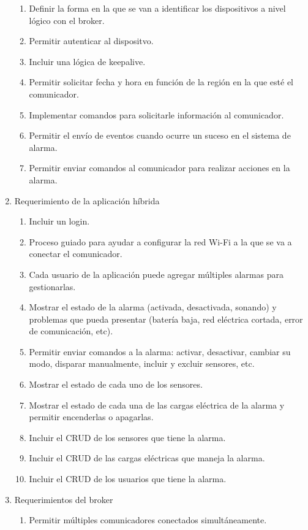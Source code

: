 \documentclass[
11pt, %
codirector, %
]{charter}
\begin{document}
\begin{enumerate}
		\begin{enumerate}
			\item Definir la forma en la que se van a identificar los dispositivos a nivel lógico con el broker.
			\item Permitir autenticar al dispositvo.
			\item Incluir una lógica de keepalive.
			\item Permitir solicitar fecha y hora en función de la región en la que esté el comunicador.
			\item Implementar comandos para solicitarle información al comunicador.
			\item Permitir el envío de eventos cuando ocurre un suceso en el sistema de alarma.
			\item Permitir enviar comandos al comunicador para realizar acciones en la alarma.
		\end{enumerate}
	\item Requerimiento de la aplicación híbrida
		\begin{enumerate}
			\item Incluir un login.
			\item Proceso guiado para ayudar a configurar la red Wi-Fi a la que se va a conectar el comunicador.
			\item Cada usuario de la aplicación puede agregar múltiples alarmas para gestionarlas.
			\item Mostrar el estado de la alarma (activada, desactivada, sonando) y problemas que pueda presentar (batería baja, red eléctrica cortada, error de comunicación, etc).
			\item Permitir enviar comandos a la alarma: activar, desactivar, cambiar su modo, disparar manualmente, incluir y excluir sensores, etc.
			\item Mostrar el estado de cada uno de los sensores.
			\item Mostrar el estado de cada una de las cargas eléctrica de la alarma y permitir encenderlas o apagarlas.
			\item Incluir el CRUD de los sensores que tiene la alarma.
			\item Incluir el CRUD de las cargas eléctricas que maneja la alarma.
			\item Incluir el CRUD de los usuarios que tiene la alarma.
		\end{enumerate}
	\item Requerimientos del broker
		\begin{enumerate}
			\item Permitir múltiples comunicadores conectados simultáneamente.

\end{enumerate}
\end{enumerate}
\end{document}

